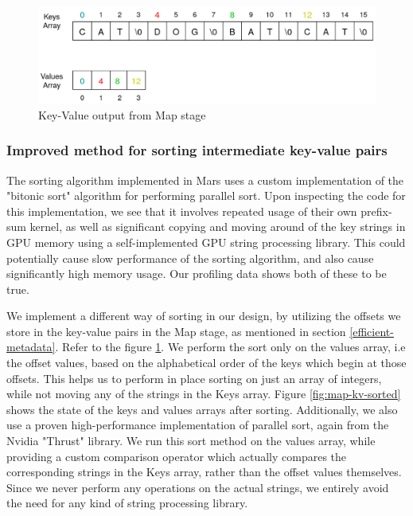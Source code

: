 \documentclass{article}
\begin{document}
\begin{figure}
    \centering
    \includegraphics[width=0.9\linewidth]{images/map-kv-out.png}
    \caption{Key-Value output from Map stage}
    \label{fig:map-kv-out}
\end{figure}


\subsubsection{Improved method for sorting intermediate key-value pairs}
The sorting algorithm implemented in Mars uses a custom implementation of the "bitonic sort" algorithm for performing parallel sort. Upon inspecting the code for this implementation, we see that it involves repeated usage of their own prefix-sum kernel, as well as significant copying and moving around of the key strings in GPU memory using a self-implemented GPU string processing library.  This could potentially cause slow performance of the sorting algorithm, and also cause significantly high memory usage. Our profiling data shows both of these to be true.

We implement a different way of sorting in our design, by utilizing the offsets we store in the key-value pairs in the Map stage, as mentioned in section \ref{efficient-metadata}. Refer to the figure \ref{fig:map-kv-out}. We perform the sort only on the values array, i.e the offset values, based on the alphabetical order of the keys which begin at those offsets. This helps us to perform in place sorting on just an array of integers, while not moving any of the strings in the Keys array. Figure \ref{fig:map-kv-sorted} shows the state of the keys and values arrays after sorting. Additionally, we also use a proven high-performance implementation of parallel sort, again from the Nvidia "Thrust" library.  We run this sort method on the values array, while providing a custom comparison operator which actually compares the corresponding strings in the Keys array, rather than the offset values themselves. Since we never perform any operations on the actual strings, we entirely avoid the need for any kind of string processing library.
\end{document}
